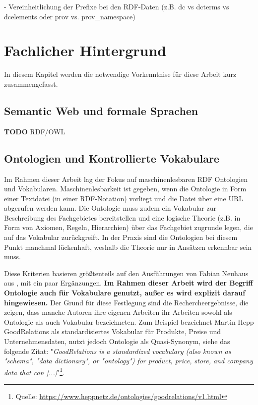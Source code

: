 \documentclass{article}
\begin{document}
- Vereinheitlichung der Prefixe bei den RDF-Daten (z.B. dc vs dcterms vs dcelements oder prov vs. prov\_namespace)

\section{Fachlicher Hintergrund}

In diesem Kapitel werden die notwendige Vorkenntnise für diese Arbeit kurz zusammengefasst.

\subsection{Semantic Web und formale Sprachen}

\textbf{TODO}
RDF/OWL

\subsection{Ontologien und Kontrollierte Vokabulare}

Im Rahmen dieser Arbeit lag der Fokus auf maschinenlesbaren RDF Ontologien und Vokabularen.
Maschinenlesbarkeit ist gegeben, wenn die Ontologie in Form einer Textdatei (in einer RDF-Notation) vorliegt und die Datei über eine URL abgerufen werden kann.
Die Ontologie muss zudem ein Vokabular zur Beschreibung des Fachgebietes bereitstellen und eine logische Theorie (z.B. in Form von Axiomen, Regeln, Hierarchien) über das Fachgebiet zugrunde legen, die auf das Vokabular zurückgreift.
In der Praxis sind die Ontologien bei diesem Punkt manchmal lückenhaft, weshalb die Theorie nur in Ansätzen erkennbar sein muss.

Diese Kriterien basieren größtenteils auf den Ausführungen von Fabian Neuhaus aus \cite{neuhaus2018ontology}, mit ein paar Ergänzungen.
\textbf{Im Rahmen dieser Arbeit wird der Begriff Ontologie auch für Vokabulare genutzt, außer es wird explizit darauf hingewiesen.}
Der Grund für diese Festlegung sind die Rechercheergebnisse, die zeigen, dass manche Autoren ihre eigenen Arbeiten ihr Arbeiten sowohl als Ontologie als auch Vokabular bezeichneten.
Zum Beispiel bezeichnet Martin Hepp GoodRelations als standardisiertes Vokabular für Produkte, Preise und Unternehmensdaten, nutzt jedoch Ontologie als Quasi-Synonym, siehe das folgende Zitat: "\textit{GoodRelations is a standardized vocabulary (also known as "schema", "data dictionary", or "ontology") for product, price, store, and company data that can [...]}"\footnote{Quelle: \url{https://www.heppnetz.de/ontologies/goodrelations/v1.html}}.
\end{document}
